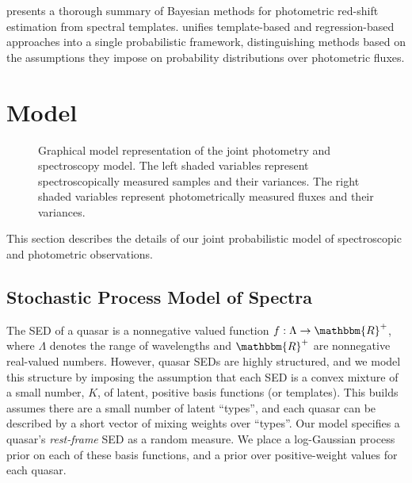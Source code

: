 \documentclass{article}
\newcommand{\R}{\mathbbm{R}}
\newcommand{\red}[1]{\textcolor{red}{[TODO: #1]}}
\begin{document}
\citet{benitez2000bayesian} presents a thorough summary of Bayesian methods for photometric red-shift estimation from spectral templates.  
\citet{budavari2009unified} unifies template-based and regression-based
approaches into a single probabilistic framework, distinguishing methods based on the assumptions they impose on probability distributions over photometric fluxes. 



\section{Model}

\begin{figure}

\caption{Graphical model representation of the joint photometry and spectroscopy model.  The left shaded variables represent spectroscopically measured samples and their variances.  The right shaded variables represent photometrically measured fluxes and their variances. }
\label{fig:graphical}
\end{figure}


\label{sec:model}
This section describes the details of our joint probabilistic model of spectroscopic and photometric observations.  

\subsection{Stochastic Process Model of Spectra}
The SED of a quasar is a nonnegative valued function $f : \Lambda \rightarrow \R^+$, where $\Lambda$ denotes the range of wavelengths and $\R^+$ are nonnegative real-valued numbers.  However, quasar SEDs are highly structured, and we model this structure by imposing the assumption that each SED is a convex mixture of a small number, $K$, of latent, positive basis functions (or templates).  
This builds assumes there are a small number of latent ``types'', and each quasar can be described by a short vector of mixing weights over ``types''. 
Our model specifies a quasar's \emph{rest-frame} SED as a random measure. 
We place a log-Gaussian process prior on each of these basis functions, and a prior over positive-weight values for each quasar.  
\end{document}

